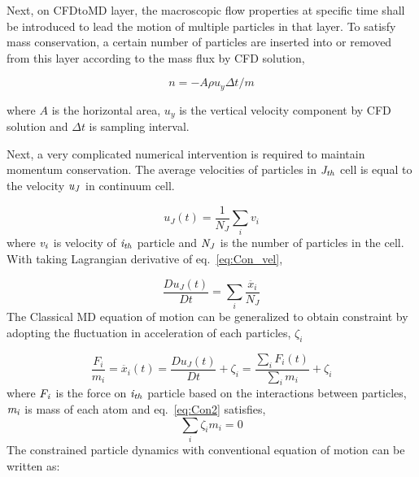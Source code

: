 \documentclass[conference,final]{IEEEtran}
\begin{document}
Next, on CFDtoMD layer, the macroscopic flow properties at specific time shall be introduced to lead the motion of multiple particles in that layer. To satisfy mass conservation, a certain number of particles are inserted into or removed from this layer according to the mass flux by CFD solution,

\vspace{-.2em}
\begin{equation}
n = -A \rho u_y \Delta t / m
 \label{eq:Mass_Flux}
\end{equation}
\normalsize

where $A$ is the horizontal area, $u_y$ is the vertical velocity component by CFD solution and $\Delta t$ is sampling interval.

Next, a very complicated numerical intervention is required to maintain momentum conservation. The average velocities of particles in $\it J_{th}$ cell is equal to the velocity $\it u_{J}$ in continuum cell.

\vspace{-.2em}
\begin{equation}
 u_{J}(t) = \frac{1}{N_{J}} \displaystyle\sum_{i} v_{i}
 \label{eq:Con_vel}
\end{equation}
\normalsize
where $\it v_{i}$ is velocity of $\it i_{th}$ particle and $\it N_{J}$ is the number of particles in the cell. With taking Lagrangian derivative of eq.~\ref{eq:Con_vel},

\vspace{-.2em}
\begin{equation}
 \frac{Du_{J}(t)}{Dt} =  \displaystyle\sum_{i} \frac{\ddot{x_{i}}}{N_{J}}
 \label{eq:Lagrangian}
\end{equation}
\normalsize
The Classical MD equation of motion can be generalized to obtain constraint by adopting the fluctuation in acceleration of each particles, $\zeta_{i}$

\vspace{-.2em}
\begin{equation}
 \frac{F_{i}}{m_{i}} = \ddot{x_{i}}(t)  =   \frac{Du_{J}(t)}{Dt} + \zeta_{i} = \frac{\displaystyle\sum_{i}F_{i}(t)} {\displaystyle\sum_{i}m_{i}} +   \zeta_{i}
 \label{eq:Con2}
\end{equation}
\normalsize
where $\it F_{i}$ is the force on $\it i_{th}$ particle based on the interactions between particles,  $\it m_{i}$ is mass of each atom and  eq.~\ref{eq:Con2} satisfies,
\vspace{-.2em}
\begin{equation}
\displaystyle\sum_{i}\zeta_{i}m_{i} = 0
 \label{eq:Con2}
\end{equation}
\normalsize
The constrained particle dynamics with conventional equation of motion can be written as:
\end{document}
